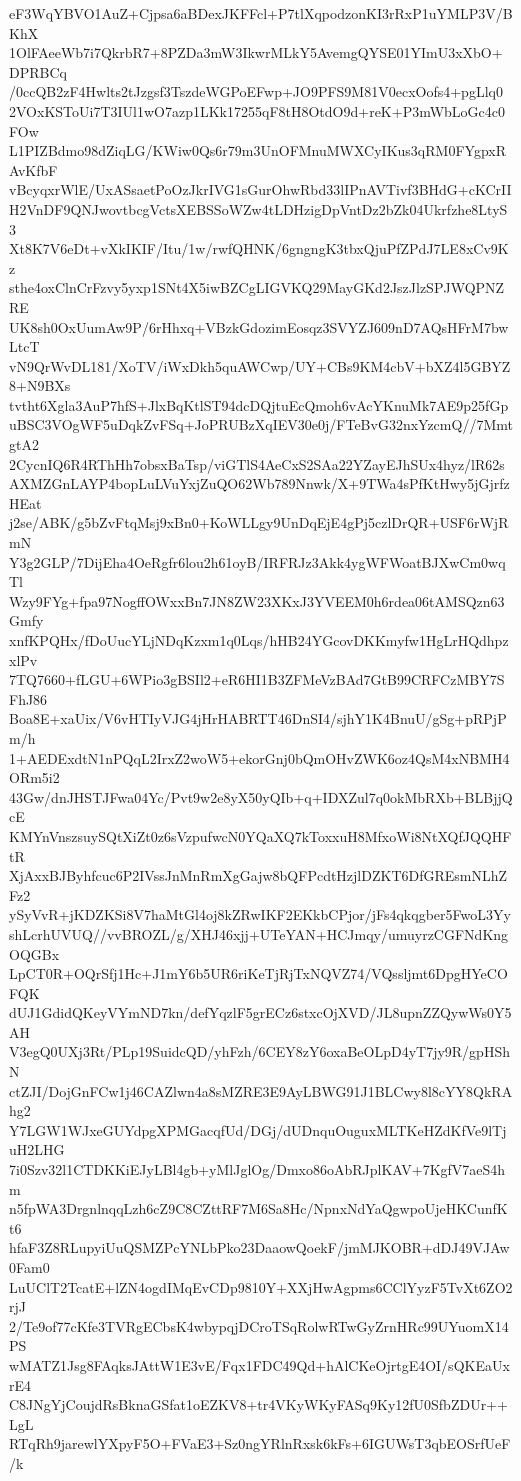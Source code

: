 eF3WqYBVO1AuZ+Cjpsa6aBDexJKFFcl+P7tlXqpodzonKI3rRxP1uYMLP3V/BKhX
1OlFAeeWb7i7QkrbR7+8PZDa3mW3IkwrMLkY5AvemgQYSE01YImU3xXbO+DPRBCq
/0ccQB2zF4Hwlts2tJzgsf3TszdeWGPoEFwp+JO9PFS9M81V0ecxOofs4+pgLlq0
2VOxKSToUi7T3IUl1wO7azp1LKk17255qF8tH8OtdO9d+reK+P3mWbLoGc4c0FOw
L1PIZBdmo98dZiqLG/KWiw0Qs6r79m3UnOFMnuMWXCyIKus3qRM0FYgpxRAvKfbF
vBcyqxrWlE/UxASsaetPoOzJkrIVG1sGurOhwRbd33lIPnAVTivf3BHdG+cKCrII
H2VnDF9QNJwovtbcgVctsXEBSSoWZw4tLDHzigDpVntDz2bZk04Ukrfzhe8LtyS3
Xt8K7V6eDt+vXkIKIF/Itu/1w/rwfQHNK/6gngngK3tbxQjuPfZPdJ7LE8xCv9Kz
sthe4oxClnCrFzvy5yxp1SNt4X5iwBZCgLIGVKQ29MayGKd2JszJlzSPJWQPNZRE
UK8sh0OxUumAw9P/6rHhxq+VBzkGdozimEosqz3SVYZJ609nD7AQsHFrM7bwLtcT
vN9QrWvDL181/XoTV/iWxDkh5quAWCwp/UY+CBs9KM4cbV+bXZ4l5GBYZ8+N9BXs
tvtht6Xgla3AuP7hfS+JlxBqKtlST94dcDQjtuEcQmoh6vAcYKnuMk7AE9p25fGp
uBSC3VOgWF5uDqkZvFSq+JoPRUBzXqIEV30e0j/FTeBvG32nxYzcmQ//7MmtgtA2
2CycnIQ6R4RThHh7obsxBaTsp/viGTlS4AeCxS2SAa22YZayEJhSUx4hyz/lR62s
AXMZGnLAYP4bopLuLVuYxjZuQO62Wb789Nnwk/X+9TWa4sPfKtHwy5jGjrfzHEat
j2se/ABK/g5bZvFtqMsj9xBn0+KoWLLgy9UnDqEjE4gPj5czlDrQR+USF6rWjRmN
Y3g2GLP/7DijEha4OeRgfr6lou2h61oyB/IRFRJz3Akk4ygWFWoatBJXwCm0wqTl
Wzy9FYg+fpa97NogffOWxxBn7JN8ZW23XKxJ3YVEEM0h6rdea06tAMSQzn63Gmfy
xnfKPQHx/fDoUucYLjNDqKzxm1q0Lqs/hHB24YGcovDKKmyfw1HgLrHQdhpzxlPv
7TQ7660+fLGU+6WPio3gBSIl2+eR6HI1B3ZFMeVzBAd7GtB99CRFCzMBY7SFhJ86
Boa8E+xaUix/V6vHTIyVJG4jHrHABRTT46DnSI4/sjhY1K4BnuU/gSg+pRPjPm/h
1+AEDExdtN1nPQqL2IrxZ2woW5+ekorGnj0bQmOHvZWK6oz4QsM4xNBMH4ORm5i2
43Gw/dnJHSTJFwa04Yc/Pvt9w2e8yX50yQIb+q+IDXZul7q0okMbRXb+BLBjjQcE
KMYnVnszsuySQtXiZt0z6sVzpufwcN0YQaXQ7kToxxuH8MfxoWi8NtXQfJQQHFtR
XjAxxBJByhfcuc6P2IVssJnMnRmXgGajw8bQFPcdtHzjlDZKT6DfGREsmNLhZFz2
ySyVvR+jKDZKSi8V7haMtGl4oj8kZRwIKF2EKkbCPjor/jFs4qkqgber5FwoL3Yy
shLcrhUVUQ//vvBROZL/g/XHJ46xjj+UTeYAN+HCJmqy/umuyrzCGFNdKngOQGBx
LpCT0R+OQrSfj1Hc+J1mY6b5UR6riKeTjRjTxNQVZ74/VQssljmt6DpgHYeCOFQK
dUJ1GdidQKeyVYmND7kn/defYqzlF5grECz6stxcOjXVD/JL8upnZZQywWs0Y5AH
V3egQ0UXj3Rt/PLp19SuidcQD/yhFzh/6CEY8zY6oxaBeOLpD4yT7jy9R/gpHShN
ctZJI/DojGnFCw1j46CAZlwn4a8sMZRE3E9AyLBWG91J1BLCwy8l8cYY8QkRAhg2
Y7LGW1WJxeGUYdpgXPMGacqfUd/DGj/dUDnquOuguxMLTKeHZdKfVe9lTjuH2LHG
7i0Szv32l1CTDKKiEJyLBl4gb+yMlJglOg/Dmxo86oAbRJplKAV+7KgfV7aeS4hm
n5fpWA3DrgnlnqqLzh6cZ9C8CZttRF7M6Sa8Hc/NpnxNdYaQgwpoUjeHKCunfKt6
hfaF3Z8RLupyiUuQSMZPcYNLbPko23DaaowQoekF/jmMJKOBR+dDJ49VJAw0Fam0
LuUClT2TcatE+lZN4ogdIMqEvCDp9810Y+XXjHwAgpms6CClYyzF5TvXt6ZO2rjJ
2/Te9of77cKfe3TVRgECbsK4wbypqjDCroTSqRolwRTwGyZrnHRc99UYuomX14PS
wMATZ1Jsg8FAqksJAttW1E3vE/Fqx1FDC49Qd+hAlCKeOjrtgE4OI/sQKEaUxrE4
C8JNgYjCoujdRsBknaGSfat1oEZKV8+tr4VKyWKyFASq9Ky12fU0SfbZDUr++LgL
RTqRh9jarewlYXpyF5O+FVaE3+Sz0ngYRlnRxsk6kFs+6IGUWsT3qbEOSrfUeF/k
